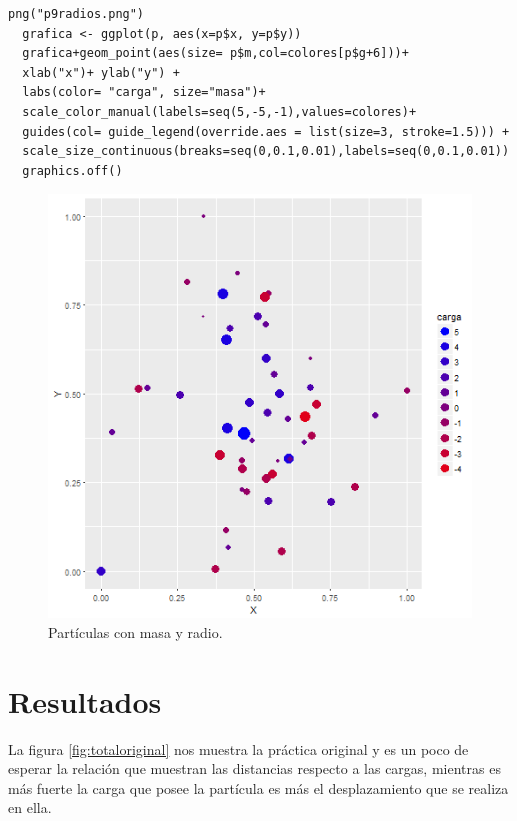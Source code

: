 \documentclass[a4paper]{article}
\begin{document}
\begin{lstlisting}[frame=single]
  png("p9radios.png")
  grafica <- ggplot(p, aes(x=p$x, y=p$y))
  grafica+geom_point(aes(size= p$m,col=colores[p$g+6]))+ 
  xlab("x")+ ylab("y") + 
  labs(color= "carga", size="masa")+
  scale_color_manual(labels=seq(5,-5,-1),values=colores)+
  guides(col= guide_legend(override.aes = list(size=3, stroke=1.5))) +
  scale_size_continuous(breaks=seq(0,0.1,0.01),labels=seq(0,0.1,0.01))
  graphics.off()
\end{lstlisting}

\begin{figure}[h]
\centering
\includegraphics[width=0.7\linewidth]{p9i}
\caption{Partículas con masa y radio.}
\label{fig:p9i}
\end{figure}


\section{Resultados}
La figura \ref*{fig:totaloriginal} nos muestra la práctica original y es un poco de esperar la relación que muestran las distancias respecto a las cargas, mientras es más fuerte la carga que posee la partícula es más el desplazamiento que se realiza en ella.
\end{document}
